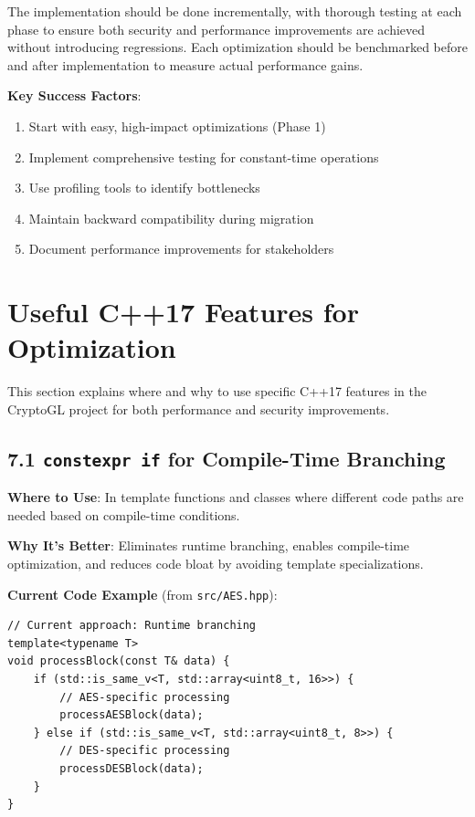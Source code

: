 \documentclass[11pt,a4paper]{article}
\begin{document}
The implementation should be done incrementally, with thorough testing at each phase to ensure both security and performance improvements are achieved without introducing regressions. Each optimization should be benchmarked before and after implementation to measure actual performance gains.

\textbf{Key Success Factors}:
\begin{enumerate}
    \item Start with easy, high-impact optimizations (Phase 1)
    \item Implement comprehensive testing for constant-time operations
    \item Use profiling tools to identify bottlenecks
    \item Maintain backward compatibility during migration
    \item Document performance improvements for stakeholders
\end{enumerate}

\appendix

\section{Useful C++17 Features for Optimization}

This section explains where and why to use specific C++17 features in the CryptoGL project for both performance and security improvements.

\subsection{7.1 \texttt{constexpr if} for Compile-Time Branching}

\textbf{Where to Use}: In template functions and classes where different code paths are needed based on compile-time conditions.

\textbf{Why It's Better}: Eliminates runtime branching, enables compile-time optimization, and reduces code bloat by avoiding template specializations.

\textbf{Current Code Example} (from \texttt{src/AES.hpp}):
\begin{lstlisting}
// Current approach: Runtime branching
template<typename T>
void processBlock(const T& data) {
    if (std::is_same_v<T, std::array<uint8_t, 16>>) {
        // AES-specific processing
        processAESBlock(data);
    } else if (std::is_same_v<T, std::array<uint8_t, 8>>) {
        // DES-specific processing
        processDESBlock(data);
    }
}
\end{lstlisting}
\end{document}

